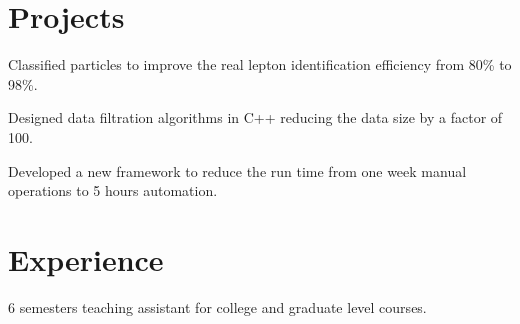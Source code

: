 \documentclass[letterpaper]{deedy-resume-openfont}
\begin{document}

\section{Projects}



\location{}
\begin{tightemize}
\item Classified particles to improve the real lepton identification efficiency from 80\% to 98\%.
\item Designed data filtration algorithms in C++ reducing the data size by a factor of 100.
\item Developed a new framework to reduce the run time from one week manual operations to 5 hours automation.
\end{tightemize}
\sectionsep


\section{Experience}

\begin{tightemize}
\item 6 semesters teaching assistant for college and graduate level courses.
\end{tightemize}
\sectionsep
\end{document}
